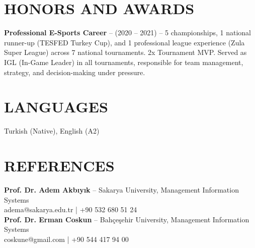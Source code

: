 \documentclass[a4paper,8pt]{article}
\begin{document}
\section{HONORS AND AWARDS}
{\small
\textbf{Professional E-Sports Career} -- (2020 -- 2021) -- 5 championships, 1 national runner-up (TESFED Turkey Cup), and 1 professional league experience (Zula Super League) across 7 national tournaments. 2x Tournament MVP. Served as IGL (In-Game Leader) in all tournaments, responsible for team management, strategy, and decision-making under pressure.
}

\section{LANGUAGES}
{\small Turkish (Native), English (A2)}

\section{REFERENCES}
{\small
\textbf{Prof. Dr. Adem Akbıyık} -- Sakarya University, Management Information Systems\\
adema@sakarya.edu.tr | +90 532 680 51 24\\[3pt]
\textbf{Prof. Dr. Erman Coskun} -- Bahçeşehir University, Management Information Systems\\
coskune@gmail.com | +90 544 417 94 00
}
\end{document}
